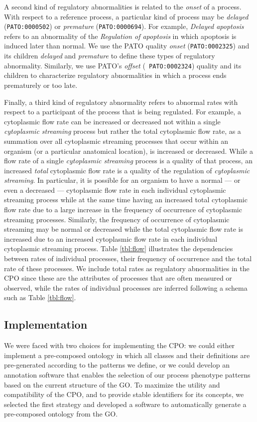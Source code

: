 \documentclass[12pt]{article}
\begin{document}
A second kind of regulatory abnormalities is related to the {\em
  onset} of a process. With respect to a reference process, a
particular kind of process may be {\em delayed} ({\tt PATO:0000502})
or {\em premature} ({\tt PATO:0000694}). For example, {\em Delayed
  apoptosis} refers to an abnormality of the {\em Regulation of
  apoptosis} in which apoptosis is induced later than normal.  We use
the PATO quality {\em onset} ({\tt PATO:0002325}) and its children
{\em delayed} and {\em premature} to define these types of regulatory
abnormality. Similarly, we use PATO's {\em offset} ({\tt
  PATO:0002324}) quality and its children to characterize regulatory
abnormalities in which a process ends prematurely or too late.

Finally, a third kind of regulatory abnormality refers to abnormal
rates with respect to a participant of the process that is being
regulated. For example, a cytoplasmic flow rate can be increased or
decreased not within a single {\em cytoplasmic streaming} process but
rather the total cytoplasmic flow rate, as a summation over all
cytoplasmic streaming processes that occur within an organism (or a
particular anatomical location), is increased or decreased. While a
flow rate of a single {\em cytoplasmic streaming} process is a quality
of that process, an increased {\em total} cytoplasmic flow rate is a
quality of the regulation of {\em cytoplasmic streaming}. In
particular, it is possible for an organism to have a normal --- or
even a decreased --- cytoplasmic flow rate in each individual
cytoplasmic streaming process while at the same time having an
increased total cytoplasmic flow rate due to a large increase in the
frequency of occurrence of cytoplasmic streaming processes. Similarly,
the frequency of occurrence of cytoplasmic streaming may be normal or
decreased while the total cytoplasmic flow rate is increased due to an
increased cytoplasmic flow rate in each individual cytoplasmic
streaming process. Table \ref{tbl:flow} illustrates the dependencies
between rates of individual processes, their frequency of occurrence
and the total rate of these processes. We include total rates as
regulatory abnormalities in the CPO since these are the attributes of
processes that are often measured or observed, while the rates of
individual processes are inferred following a schema such as Table
\ref{tbl:flow}.

\subsection{Implementation}
We were faced with two choices for implementing the CPO: we could
either implement a pre-composed ontology in which all classes and
their definitions are pre-generated according to the patterns we
define, or we could develop an annotation software that enables the
selection of our process phenotype patterns based on the current
structure of the GO.  To maximize the utility and compatibility of the
CPO, and to provide stable identifiers for its concepts, we selected
the first strategy and developed a software to automatically generate
a pre-composed ontology from the GO.
\end{document}
